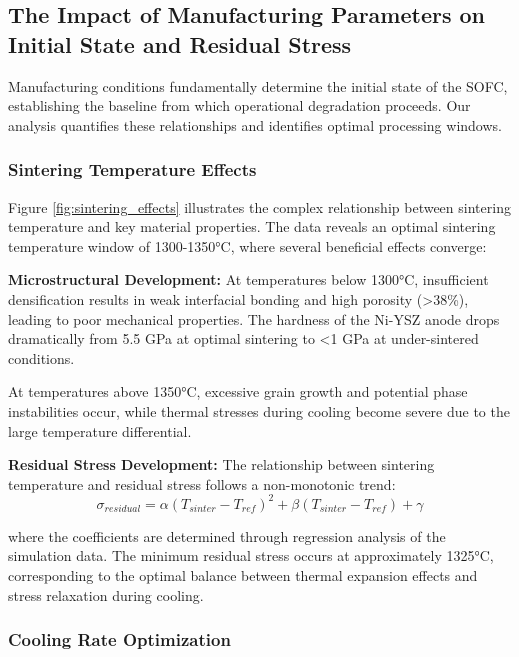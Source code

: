 \documentclass[conference]{IEEEtran}
\begin{document}
\subsection{The Impact of Manufacturing Parameters on Initial State and Residual Stress}

Manufacturing conditions fundamentally determine the initial state of the SOFC, establishing the baseline from which operational degradation proceeds. Our analysis quantifies these relationships and identifies optimal processing windows.

\subsubsection{Sintering Temperature Effects}

Figure \ref{fig:sintering_effects} illustrates the complex relationship between sintering temperature and key material properties. The data reveals an optimal sintering temperature window of 1300-1350°C, where several beneficial effects converge:

\textbf{Microstructural Development:}
At temperatures below 1300°C, insufficient densification results in weak interfacial bonding and high porosity (>38\%), leading to poor mechanical properties. The hardness of the Ni-YSZ anode drops dramatically from 5.5 GPa at optimal sintering to <1 GPa at under-sintered conditions.

At temperatures above 1350°C, excessive grain growth and potential phase instabilities occur, while thermal stresses during cooling become severe due to the large temperature differential.

\textbf{Residual Stress Development:}
The relationship between sintering temperature and residual stress follows a non-monotonic trend:
\begin{equation}
\sigma_{residual} = \alpha(T_{sinter} - T_{ref})^2 + \beta(T_{sinter} - T_{ref}) + \gamma
\end{equation}

where the coefficients are determined through regression analysis of the simulation data. The minimum residual stress occurs at approximately 1325°C, corresponding to the optimal balance between thermal expansion effects and stress relaxation during cooling.

\subsubsection{Cooling Rate Optimization}
\end{document}
